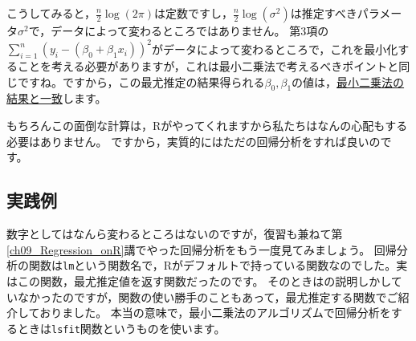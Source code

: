 \documentclass{ltjbook}
\begin{document}
こうしてみると，$\frac{n}{2} \log(2\pi)$は定数ですし，$\frac{n}{2} \log(\sigma^2) $は推定すべきパラメータ$\sigma^2$で，データによって変わるところではありません。
第3項の$\sum_{i=1}^{n} (y_i-(\beta_0+\beta_1x_i))^2$がデータによって変わるところで，これを最小化することを考える必要がありますが，これは最小二乗法で考えるべきポイントと同じですね。ですから，この最尤推定の結果得られる$\beta_0,\beta_1$の値は，\underline{最小二乗法の結果と一致}します。

もちろんこの面倒な計算は，Rがやってくれますから私たちはなんの心配もする必要はありません。
ですから，実質的にはただの回帰分析をすれば良いのです。

\subsection{実践例}
数字としてはなんら変わるところはないのですが，復習も兼ねて第\ref{ch09_Regression_onR}講でやった回帰分析をもう一度見てみましょう。
回帰分析の関数は\verb|lm|という関数名で，Rがデフォルトで持っている関数なのでした。実はこの関数，最尤推定値を返す関数だったのです。
そのときはの説明しかしていなかったのですが，関数の使い勝手のこともあって，最尤推定する関数でご紹介しておりました。
本当の意味で，最小二乗法のアルゴリズムで回帰分析をするときは\verb|lsfit|関数というものを使います。
\end{document}
